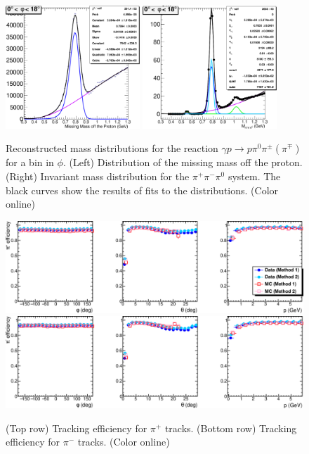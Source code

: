\begin{figure}[tbp]
\begin{center}
\includegraphics[width=0.45\textwidth]{figures/MissingOmegaFit.pdf}
\includegraphics[width=0.45\textwidth]{figures/ThreePiFit.pdf}
\caption{\label{fig:omega mass}
Reconstructed mass distributions for the reaction $\gamma p \to p\pi^0\pi^{\pm}(\pi^\mp)$ for a bin in $\phi$.
  (Left) Distribution of the missing mass off the proton.
(Right) Invariant mass distribution for the $\pi^+\pi^-\pi^0$ system.  The black
curves show the results of fits to the distributions.
 (Color online)}
\end{center}
\end{figure}

\begin{figure}[tpb]
\begin{center}
\includegraphics[width=\textwidth]{figures/PiPlusEfficiency.pdf}
\includegraphics[width=\textwidth]{figures/PiMinusEfficiency.pdf}
\caption{\label{fig:tracking efficiency}
(Top row) Tracking efficiency for $\pi^+$ tracks. (Bottom row) Tracking efficiency for $\pi^-$ tracks.  (Color online)}
\end{center}
\end{figure}


